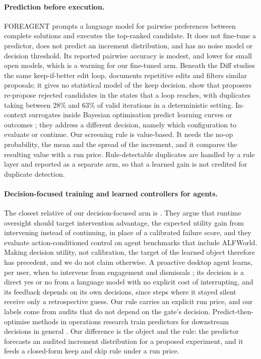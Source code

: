 \paragraph{Prediction before execution.}
FOREAGENT \citep{zheng2026foreagent} prompts a language model for pairwise preferences between complete solutions and executes the top-ranked candidate. It does not fine-tune a predictor, does not predict an increment distribution, and has no noise model or decision threshold. Its reported pairwise accuracy is modest, and lower for small open models, which is a warning for our fine-tuned arm. Beneath the Diff \citep{he2026beneath} studies the same keep-if-better edit loop, documents repetitive edits and filters similar proposals; it gives no statistical model of the keep decision. \citet{chen2026visible} show that proposers re-propose rejected candidates in the states that a loop reaches, with duplicates taking between 28\% and 63\% of valid iterations in a deterministic setting. In-context surrogates inside Bayesian optimisation predict learning curves or outcomes \citep{arxiv240416795,liu2024llambo}; they address a different decision, namely which configuration to evaluate or continue. Our screening rule is value-based. It needs the no-op probability, the mean and the spread of the increment, and it compares the resulting value with a run price. Rule-detectable duplicates are handled by a rule layer and reported as a separate arm, so that a learned gain is not credited for duplicate detection.

\paragraph{Decision-focused training and learned controllers for agents.}
The closest relative of our decision-focused arm is \citet{zhang2026calibrationcontrol}. They argue that runtime oversight should target intervention advantage, the expected utility gain from intervening instead of continuing, in place of a calibrated failure score, and they evaluate action-conditioned control on agent benchmarks that include ALFWorld. Making decision utility, not calibration, the target of the learned object therefore has precedent, and we do not claim otherwise. A proactive desktop agent learns, per user, when to intervene from engagement and dismissals \citep{shao2026deeppersonalization}; its decision is a direct yes or no from a language model with no explicit cost of interrupting, and its feedback depends on its own decisions, since steps where it stayed silent receive only a retrospective guess. Our rule carries an explicit run price, and our labels come from audits that do not depend on the gate's decision. Predict-then-optimise methods in operations research train predictors for downstream decisions in general \citep{arxiv171008005,wilder2019melding}. Our difference is the object and the rule: the predictor forecasts an audited increment distribution for a proposed experiment, and it feeds a closed-form keep and skip rule under a run price.

